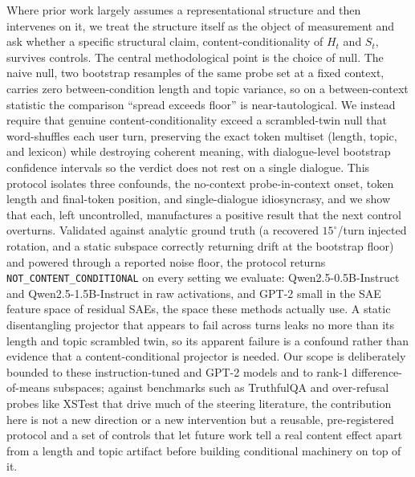 Where prior work largely assumes a representational structure and then intervenes on it, we treat the structure itself as the object of measurement and ask whether a specific structural claim, content-conditionality of $H_t$ and $S_t$, survives controls. The central methodological point is the choice of null. The naive null, two bootstrap resamples of the same probe set at a fixed context, carries zero between-condition length and topic variance, so on a between-context statistic the comparison ``spread exceeds floor'' is near-tautological. We instead require that genuine content-conditionality exceed a scrambled-twin null that word-shuffles each user turn, preserving the exact token multiset (length, topic, and lexicon) while destroying coherent meaning, with dialogue-level bootstrap confidence intervals so the verdict does not rest on a single dialogue. This protocol isolates three confounds, the no-context probe-in-context onset, token length and final-token position, and single-dialogue idiosyncrasy, and we show that each, left uncontrolled, manufactures a positive result that the next control overturns. Validated against analytic ground truth (a recovered $15^\circ$/turn injected rotation, and a static subspace correctly returning drift at the bootstrap floor) and powered through a reported noise floor, the protocol returns \texttt{NOT\_CONTENT\_CONDITIONAL} on every setting we evaluate: Qwen2.5-0.5B-Instruct and Qwen2.5-1.5B-Instruct \citep{qwen25} in raw activations, and GPT-2 small in the SAE feature space of residual SAEs, the space these methods actually use. A static disentangling projector that appears to fail across turns leaks no more than its length and topic scrambled twin, so its apparent failure is a confound rather than evidence that a content-conditional projector is needed. Our scope is deliberately bounded to these instruction-tuned and GPT-2 models and to rank-1 difference-of-means subspaces; against benchmarks such as TruthfulQA \citep{lin2022truthfulqa} and over-refusal probes like XSTest \citep{rottger2024xstest} that drive much of the steering literature, the contribution here is not a new direction or a new intervention but a reusable, pre-registered protocol and a set of controls that let future work tell a real content effect apart from a length and topic artifact before building conditional machinery on top of it.
